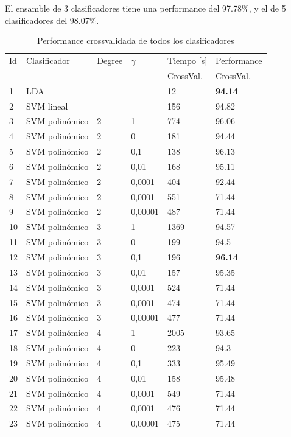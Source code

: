 \documentclass[journal]{IEEEtran}
\begin{document}
El ensamble de 3 clasificadores tiene una performance del 97.78\%, y el
de 5 clasificadores del 98.07\%.

\begin{table}[!hb]
\caption{Performance crossvalidada de todos los clasificadores}
\label{table:main_results}
\centering
\begin{tabular}{l | l l l | l l}
	Id	&	Clasificador	&	Degree	&    $\gamma$	& Tiempo [s]  &	Performance \\
	&			&		&		&	CrossVal.	&	CrossVal. \\
\hline
	1	&	LDA	&		&		&	12	&	\textbf{94.14} \\
\hline
	2	&	SVM lineal 	&		&		&	156	&	94.82 \\
	3 	&	SVM polinómico 	&	2	&	1	&	774	&	96.06 \\
	4 	&	SVM polinómico 	&	2	&	0	&	181	&	94.44 \\
	5 	&	SVM polinómico 	&	2	&	 0,1  	&	138	&	96.13 \\
	6 	&	SVM polinómico 	&	2	&	 0,01  	&	168	&	95.11 \\
	7 	&	SVM polinómico 	&	2	&	0,0001	&	404	&	92.44 \\
	8 	&	SVM polinómico 	&	2	&	 0,0001  	&	551	&	71.44 \\
	9 	&	SVM polinómico 	&	2	&	 0,00001  	&	487	&	71.44 \\
	10	&	SVM polinómico 	&	3	&	1	&	1369	&	94.57 \\
	11	&	SVM polinómico 	&	3	&	0	&	199	&	94.5 \\
	12	&	SVM polinómico 	&	3	&	 0,1  	&	196	&	\textbf{96.14} \\
	13	&	SVM polinómico 	&	3	&	 0,01  	&	157	&	95.35 \\
	14	&	SVM polinómico 	&	3	&	0,0001	&	524	&	71.44 \\
	15	&	SVM polinómico 	&	3	&	 0,0001  	&	474	&	71.44 \\
	16	&	SVM polinómico 	&	3	&	 0,00001  	&	477	&	71.44 \\
	17	&	SVM polinómico 	&	4	&	1	&	2005	&	93.65 \\
	18	&	SVM polinómico 	&	4	&	0	&	223	&	94.3 \\
	19	&	SVM polinómico 	&	4	&	 0,1  	&	333	&	95.49 \\
	20	&	SVM polinómico 	&	4	&	 0,01  	&	158	&	95.48 \\
	21	&	SVM polinómico 	&	4	&	0,0001	&	549	&	71.44 \\
	22	&	SVM polinómico 	&	4	&	 0,0001  	&	476	&	71.44 \\
	23	&	SVM polinómico 	&	4	&	 0,00001  	&	475	&	71.44 \\

\end{tabular}
\end{table}
\end{document}

